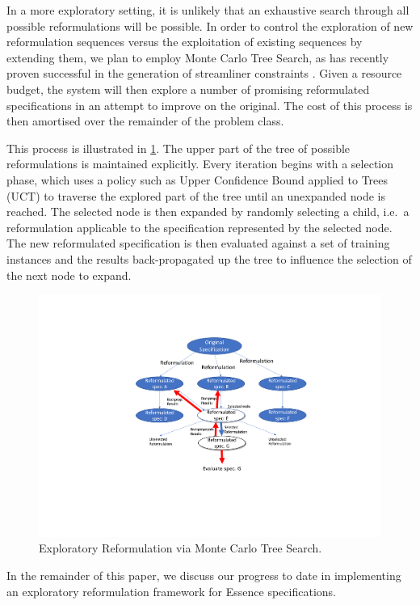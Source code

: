 \documentclass[a4paper,UKenglish,cleveref, autoref,pdfa]{lipics-v2021}
\begin{document}
In a more exploratory setting, it is unlikely that an exhaustive search through all possible reformulations will be possible. In order to control the exploration of new reformulation sequences versus the exploitation of existing sequences by extending them, we plan to employ Monte Carlo Tree Search, as has recently proven successful in the generation of streamliner constraints \cite{SPRACKLEN2023103915}.
Given a resource budget, the system will then explore a number of promising reformulated specifications in an attempt to improve on the original. The cost of this process is then amortised over the remainder of the problem class.

This process is illustrated in \cref{fig:MCTSReformulation}. The upper part of the tree of possible reformulations is maintained explicitly. Every iteration begins with a selection phase, which uses a policy such as Upper Confidence Bound applied to Trees (UCT) \cite{browne2012survey} to traverse the explored part of the tree until an unexpanded node is reached. The selected node is then expanded by randomly selecting a child, i.e.~a reformulation applicable to the specification represented by the selected node. The new reformulated specification is then evaluated against a set of training instances and the results back-propagated up the tree to influence the selection of the next node to expand.

\begin{figure}
  \centering
  \includegraphics[width=0.75\linewidth]{MCTSReformulation.pdf}
  \caption{Exploratory Reformulation via Monte Carlo Tree Search.}
  \label{fig:MCTSReformulation}
\end{figure}

In the remainder of this paper, we discuss our progress to date in implementing an exploratory reformulation framework for {\sc Essence} specifications.
\end{document}
